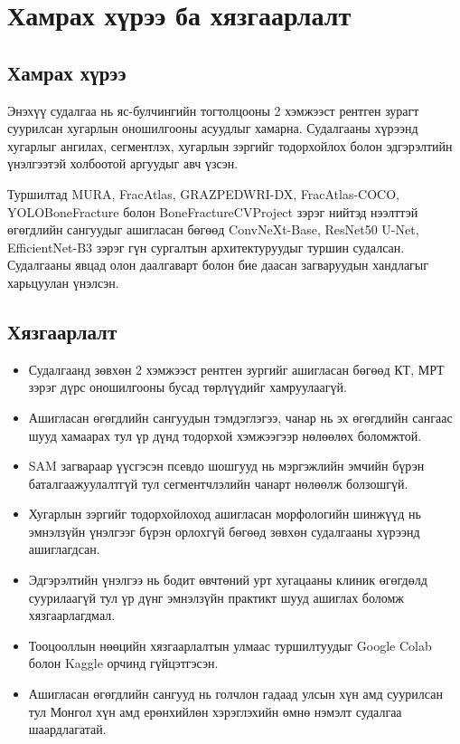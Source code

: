 \section{Хамрах хүрээ ба хязгаарлалт}

\subsection*{Хамрах хүрээ}

Энэхүү судалгаа нь яс-булчингийн тогтолцооны 2 хэмжээст рентген зурагт суурилсан хугарлын оношилгооны асуудлыг хамарна. Судалгааны хүрээнд хугарлыг ангилах, сегментлэх, хугарлын зэргийг тодорхойлох болон эдгэрэлтийн үнэлгээтэй холбоотой аргуудыг авч үзсэн.

Туршилтад MURA, FracAtlas, GRAZPEDWRI-DX, FracAtlas-COCO, YOLOBoneFracture болон BoneFractureCVProject зэрэг нийтэд нээлттэй өгөгдлийн сангуудыг ашигласан бөгөөд ConvNeXt-Base, ResNet50 U-Net, EfficientNet-B3 зэрэг гүн сургалтын архитектуруудыг туршин судалсан. Судалгааны явцад олон даалгаварт болон бие даасан загваруудын хандлагыг харьцуулан үнэлсэн.

\subsection*{Хязгаарлалт}

\begin{itemize}[nosep]
    \item Судалгаанд зөвхөн 2 хэмжээст рентген зургийг ашигласан бөгөөд КТ, МРТ зэрэг дүрс оношилгооны бусад төрлүүдийг хамруулаагүй.
    \item Ашигласан өгөгдлийн сангуудын тэмдэглэгээ, чанар нь эх өгөгдлийн сангаас шууд хамаарах тул үр дүнд тодорхой хэмжээгээр нөлөөлөх боломжтой.
    \item SAM загвараар үүсгэсэн псевдо шошгууд нь мэргэжлийн эмчийн бүрэн баталгаажуулалтгүй тул сегментчлэлийн чанарт нөлөөлж болзошгүй.
    \item Хугарлын зэргийг тодорхойлоход ашигласан морфологийн шинжүүд нь эмнэлзүйн үнэлгээг бүрэн орлохгүй бөгөөд зөвхөн судалгааны хүрээнд ашиглагдсан.
    \item Эдгэрэлтийн үнэлгээ нь бодит өвчтөний урт хугацааны клиник өгөгдөлд суурилаагүй тул үр дүнг эмнэлзүйн практикт шууд ашиглах боломж хязгаарлагдмал.
    \item Тооцооллын нөөцийн хязгаарлалтын улмаас туршилтуудыг Google Colab болон Kaggle орчинд гүйцэтгэсэн.
    \item Ашигласан өгөгдлийн сангууд нь голчлон гадаад улсын хүн амд суурилсан тул Монгол хүн амд ерөнхийлөн хэрэглэхийн өмнө нэмэлт судалгаа шаардлагатай.
\end{itemize}


